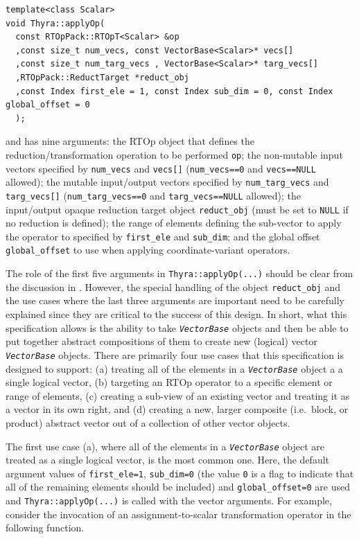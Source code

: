 \documentclass[pdf,ps2pdf,11pt]{SANDreport}
\begin{document}
{\scriptsize\begin{verbatim}
template<class Scalar>
void Thyra::applyOp(
  const RTOpPack::RTOpT<Scalar> &op
  ,const size_t num_vecs, const VectorBase<Scalar>* vecs[]
  ,const size_t num_targ_vecs , VectorBase<Scalar>* targ_vecs[]
  ,RTOpPack::ReductTarget *reduct_obj
  ,const Index first_ele = 1, const Index sub_dim = 0, const Index global_offset = 0
  );
\end{verbatim}}

{}\noindent{}and has nine arguments: the RTOp object that defines the
reduction/transformation operation to be performed {}\texttt{op}; the
non-mutable input vectors specified by {}\texttt{num\_vecs} and
{}\texttt{vecs[]} (\texttt{num\_vecs==0} and {}\texttt{vecs==NULL}
allowed); the mutable input/output vectors specified by
{}\texttt{num\_targ\_vecs} and {}\texttt{targ\-\_vecs[]}
(\texttt{num\_targ\_vecs==0} and {}\texttt{targ\_vecs==NULL} allowed);
the input/output opaque reduction target object {}\texttt{reduct\_obj}
(must be set to {}\texttt{NULL} if no reduction is defined); the range
of elements defining the sub-vector to apply the operator to specified
by {}\texttt{first\_ele} and {}\texttt{sub\_dim}; and the global
offset {}\texttt{global\_offset} to use when applying
coordinate-variant operators.

The role of the first five arguments in
{}\texttt{Thyra::applyOp(\-...)}  should be clear from the
discussion in {}\cite{ref:rtop_toms}.  However, the special handling
of the object {}\texttt{reduct\_obj} and the use cases where the last
three arguments are important need to be carefully explained since
they are critical to the success of this design.  In short, what this
specification allows is the ability to take {}\texttt{\textit{Vector\-Base}}
objects and then be able to put together abstract compositions of them
to create new (logical) vector {}\texttt{\textit{Vector\-Base}} objects.
There are primarily four use cases that this specification is designed
to support: (a) treating all of the elements in a
{}\texttt{\textit{Vector\-Base}} object a a single logical vector, (b)
targeting an RTOp operator to a specific element or range of elements,
(c) creating a sub-view of an existing vector and treating it as a
vector in its own right, and (d) creating a new, larger composite
(i.e.~block, or product) abstract vector out of a collection of other
vector objects.

The first use case (a), where all of the elements in a
{}\texttt{\textit{Vector\-Base}} object are treated as a single logical
vector, is the most common one.  Here, the default argument values of
{}\texttt{first\_ele=1}, {}\texttt{sub\_dim=0} (the value {}\texttt{0}
is a flag to indicate that all of the remaining elements should be
included) and {}\texttt{global\_offset=0} are used and
{}\texttt{Thyra::applyOp(\-...)} is called with the vector
arguments.  For example, consider the invocation of an
assignment-to-scalar transformation operator in the following
function.
\end{document}
